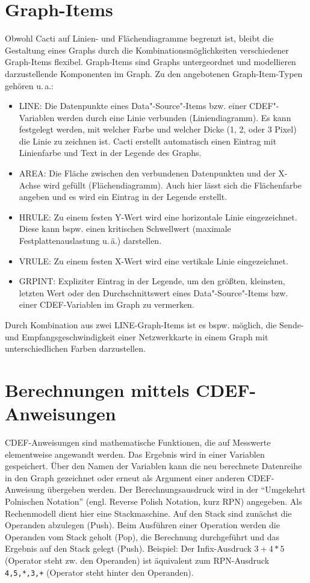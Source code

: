 \documentclass[12pt,ngerman,toc=listofnumbered,toc=bibliographynumbered,toc=index,headsepline=true]{scrbook}
\begin{document}
\section{Graph-Items}
\label{subsec:GraphItems}
Obwohl Cacti auf Linien- und Flächendiagramme begrenzt ist, bleibt die
Gestaltung eines Graphs durch die Kombinationsmöglichkeiten verschiedener
Graph-Items flexibel. Graph-Items sind Graphs untergeordnet und modellieren
darzustellende Komponenten im Graph. Zu den angebotenen Graph-Item-Typen gehören
u.\,a.:
\begin{itemize}
  \item LINE: Die Datenpunkte eines Data"-Source"-Items bzw. einer CDEF"-Variablen
  werden durch eine Linie verbunden (Liniendiagramm). Es kann festgelegt
  werden, mit welcher Farbe und welcher Dicke (1, 2, oder 3 Pixel) die Linie zu
  zeichnen ist. Cacti erstellt automatisch einen Eintrag mit Linienfarbe und
  Text in der Legende des Graphs. 
  \item AREA: Die Fläche zwischen den verbundenen Datenpunkten und der X-Achse
  wird gefüllt (Flächendiagramm). Auch hier lässt sich die Flächenfarbe angeben
  und es wird ein Eintrag in der Legende erstellt.
  \item HRULE: Zu einem festen Y-Wert wird eine horizontale Linie eingezeichnet.
  Diese kann bspw. einen kritischen Schwellwert (maximale Festplattenauslastung
  u.\,ä.) darstellen.
  \item VRULE: Zu einem festen X-Wert wird eine vertikale Linie eingezeichnet.
  \item GRPINT: Expliziter Eintrag in der Legende, um den größten, kleinsten,
  letzten Wert oder den Durchschnittswert eines Data"-Source"-Items bzw. einer
  CDEF-Variablen im Graph zu vermerken.
\end{itemize}
Durch Kombination aus zwei LINE-Graph-Items ist es bspw. möglich, die Sende-
und Empfangsgeschwindigkeit einer Netzwerkkarte in einem Graph mit
unterschiedlichen Farben darzustellen.

\section{Berechnungen mittels CDEF-Anweisungen}
\label{subsec:CDEF}
CDEF-Anweisungen sind mathematische Funktionen, die auf Messwerte elementweise
angewandt werden. Das Ergebnis wird in einer Variablen gespeichert. Über den
Namen der Variablen kann die neu berechnete Datenreihe in den Graph gezeichnet
oder erneut als Argument einer anderen CDEF-Anweisung übergeben werden. Der
Berechnungsausdruck wird in der \enquote{Umgekehrt Polnischen Notation} (engl.
Reverse Polish Notation, kurz RPN) angegeben. Als Rechenmodell dient hier eine
Stackmaschine. Auf den Stack sind zunächst die Operanden abzulegen (Push). Beim
Ausführen einer Operation werden die Operanden vom Stack geholt (Pop), die
Berechnung durchgeführt und das Ergebnis auf den Stack gelegt (Push). Beispiel:
Der Infix-Ausdruck $3+4*5$ (Operator steht zw. den Operanden) ist äquivalent zum
RPN-Ausdruck \texttt{4,5,*,3,+} (Operator steht hinter den Operanden).
\end{document}

